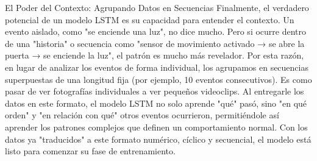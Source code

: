 \begin{enumerate}
\begin{enumerate}
                        El Poder del Contexto: Agrupando Datos en Secuencias
                        Finalmente, el verdadero potencial de un modelo LSTM es su capacidad para entender el contexto. Un evento aislado, como "se enciende una luz", no dice mucho. Pero si ocurre dentro de una "historia" o secuencia como "sensor de movimiento activado → se abre la puerta → se enciende la luz", el patrón es mucho más revelador.
                        Por esta razón, en lugar de analizar los eventos de forma individual, los agrupamos en secuencias superpuestas de una longitud fija (por ejemplo, 10 eventos consecutivos). Es como pasar de ver fotografías individuales a ver pequeños videoclips.
                        Al entregarle los datos en este formato, el modelo LSTM no solo aprende "qué" pasó, sino "en qué orden" y "en relación con qué" otros eventos ocurrieron, permitiéndole así aprender los patrones complejos que definen un comportamiento normal. Con los datos ya "traducidos" a este formato numérico, cíclico y secuencial, el modelo está listo para comenzar su fase de entrenamiento.


\end{enumerate}
\end{enumerate}
